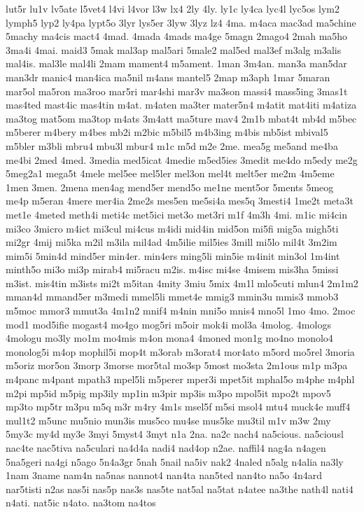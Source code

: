 {lut5r
lu1v
lv5ate
l5vet4
l4vi
l4vor
l3w
lx4
2ly
4ly.
ly1c
ly4ca
lyc4l
lyc5os
lym2
lymph5
lyp2
ly4pa
lypt5o
3lyr
lys5er
3lyw
3lyz
lz4
4ma.
m4aca
mac3ad
ma5chine
5machy
ma4cis
mact4
4mad.
4mada
4mads
ma4ge
5magn
2mago4
2mah
ma5ho
3ma4i
4mai.
maid3
5mak
mal3ap
mal5ari
5male2
mal5ed
mal3ef
m3alg
m3alis
mal4is.
mal3le
mal4li
2mam
mament4
m5ament.
1man
3m4an.
man3a
man5dar
man3dr
manic4
man4ica
ma5nil
m4ans
mantel5
2map
m3aph
1mar
5maran
mar5ol
ma5ron
ma3roo
mar5ri
mar4shi
mar3v
ma3son
massi4
mass5ing
3mas1t
mas4ted
mast4ic
mas4tin
m4at.
m4aten
ma3ter
mater5n4
m4atit
mat4iti
m4atiza
ma3tog
mat5om
ma3top
m4ats
3m4att
ma5ture
mav4
2m1b
mbat4t
mb4d
m5bec
m5berer
m4bery
m4bes
mb2i
m2bic
m5bil5
m4b3ing
m4bis
mb5ist
mbival5
m5bler
m3bli
mbru4
mbu3l
mbur4
m1c
m5d
m2e
2me.
mea5g
me5and
me4ba
me4bi
2med
4med.
3media
med5icat
4medie
m5ed5ies
3medit
me4do
m5edy
me2g
5meg2a1
mega5t
4mele
mel5ee
mel5ler
mel3on
mel4t
melt5er
me2m
4m5eme
1men
3men.
2mena
men4ag
mend5er
mend5o
me1ne
ment5or
5ments
5meog
me4p
m5eran
4mere
mer4ia
2me2s
mes5en
me5si4a
mes5q
3mesti4
1me2t
meta3t
met1e
4meted
meth4i
meti4c
met5ici
met3o
met3ri
m1f
4m3h
4mi.
m1ic
mi4cin
mi3co
3micro
m4ict
mi3cul
mi4cus
m4idi
mid4in
mid5on
mi5fi
mig5a
migh5ti
mi2gr
4mij
mi5ka
m2il
m3ila
mil4ad
4m5ilie
mil5ies
3mill
mi5lo
mil4t
3m2im
mim5i
5min4d
mind5er
min4er.
min4ers
ming5li
min5ie
m4init
min3ol
1m4int
minth5o
mi3o
mi3p
mirab4
mi5racu
m2is.
m4isc
mi4se
4misem
mis3ha
5missi
m3ist.
mis4tin
m3ists
mi2t
m5itan
4mity
3miu
5mix
4m1l
mlo5cuti
mlun4
2m1m2
mman4d
mmand5er
m3medi
mmel5li
mmet4e
mmig3
mmin3u
mmis3
mmob3
m5moc
mmor3
mmut3a
4m1n2
mnif4
m4nin
mni5o
mnis4
mno5l
1mo
4mo.
2moc
mod1
mod5ifie
mogast4
mo4go
mog5ri
m5oir
mok4i
mol3a
4molog.
4mologs
4mologu
mo3ly
mo1m
mo4mis
m4on
mona4
4moned
mon1g
mo4no
monolo4
monolog5i
m4op
mophil5i
mop4t
m3orab
m3orat4
mor4ato
m5ord
mo5rel
3moria
m5oriz
mor5on
3morp
3morse
mor5tal
mo3sp
5most
mo3sta
2m1ous
m1p
m3pa
m4panc
m4pant
mpath3
mpel5li
m5perer
mper3i
mpet5it
mphal5o
m4phe
m4phl
m2pi
mp5id
m5pig
mp3ily
mp1in
m3pir
mp3is
m3po
mpol5it
mpo2t
mpov5
mp3to
mp5tr
m3pu
m5q
m3r
m4ry
4m1s
msel5f
m5si
msol4
mtu4
muck4e
muff4
mul1t2
m5unc
mu5nio
mun3is
mus5co
mu4se
mus5ke
mu3til
m1v
m3w
2my
5my3c
my4d
my3e
3myi
5myst4
3myt
n1a
2na.
na2c
nach4
na5cious.
na5ciousl
nac4te
nac5tiva
na5culari
na4d4a
nadi4
nad4op
n2ae.
naffil4
nag4a
n4agen
5na5geri
na4gi
n5ago
5n4a3gr
5nah
5nail
na5iv
nak2
4naled
n5alg
n4alia
na3ly
1nam
3name
nam4n
na5nas
nannot4
nan4ta
nan5ted
nan4to
na5o
4n4ard
nar5tisti
n2as
nas5i
nas5p
nas3s
nas5te
nat5al
na5tat
n4atee
na3the
nath4l
nati4
n4ati.
nat5ic
n4ato.
na3tom
na4tos
}

